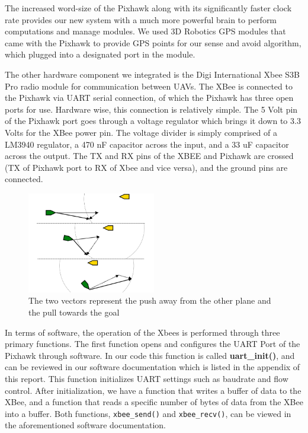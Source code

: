 \documentclass[12pt]{article}
\begin{document}
The increased word-size of the Pixhawk along with its significantly faster clock rate provides our new system with a much more powerful brain to perform computations and manage modules. We used 3D Robotics GPS modules that came with the Pixhawk to provide GPS points for our sense and avoid algorithm, which plugged into a designated port in the module.

The other hardware component we integrated is the Digi International Xbee S3B Pro radio module for communication between UAVs. The XBee is connected to the Pixhawk via UART serial connection, of which the Pixhawk has three open ports for use. Hardware wise, this connection is relatively simple. The 5 Volt pin of the Pixhawk port goes through a voltage regulator which brings it down to 3.3 Volts for the XBee power pin. The voltage divider is simply comprised of a LM3940 regulator, a 470 nF capacitor across the input, and a 33 uF capacitor across the output. The TX and RX pins of the XBEE and Pixhawk are crossed (TX of Pixhawk port to RX of Xbee and vice versa), and the ground pins are connected.

\begin{figure}[ht!]
  \centering
   \includegraphics[width=0.5\textwidth]{pushpull.png}
   \caption{The two vectors represent the push away from the other plane and the pull towards the goal}
\end{figure}

In terms of software, the operation of the Xbees is performed through three primary functions. The first function opens and configures the UART Port of the Pixhawk through software. In our code this function is called \textbf{uart\_init()}, and can be reviewed in our software documentation which is listed in the appendix of this report. This function initializes UART settings such as baudrate and flow control. After initialization, we have a function that writes a buffer of data to the XBee, and a function that reads a specific number of bytes of data from the XBee into a buffer. Both functions, \texttt{xbee\_send()} and \texttt{xbee\_recv()}, can be viewed in the aforementioned software documentation.
\end{document}
